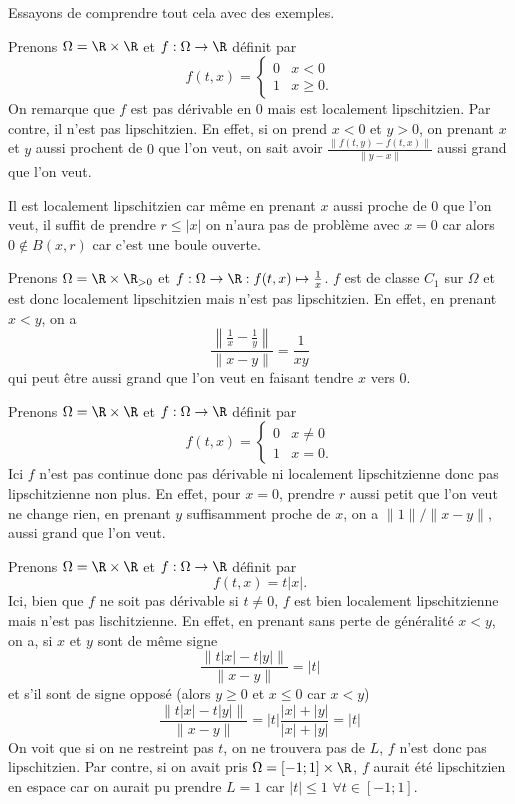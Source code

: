 Essayons de comprendre tout cela avec des exemples.
\begin{myexem}
  \label{ex:ux}
  Prenons $\Omega = \R\times\R$ et $f:\Omega\to\R$ définit par
  \[
    f(t,x) =
    \begin{cases}
      0 & x < 0\\
      1 & x \geq 0.
    \end{cases}
  \]
  On remarque que $f$ est pas dérivable en $0$ mais est localement
  lipschitzien.
  Par contre, il n'est pas lipschitzien.
  En effet, si on prend $x < 0$ et $y > 0$, on prenant $x$ et $y$ aussi
  prochent de $0$ que l'on veut,
  on sait avoir $\frac{\|f(t,y)-f(t,x)\|}{\|y-x\|}$
  aussi grand que l'on veut.

  Il est localement lipschitzien car même en prenant $x$
  aussi proche de $0$ que l'on veut,
  il suffit de prendre $r \leq |x|$ on n'aura pas de problème avec $x = 0$
  car alors $0 \notin B(x,r)$ car c'est une boule ouverte.
\end{myexem}
\begin{myexem}
  Prenons $\Omega = \R\times\R_{>0}$ et
  $f:\Omega\to\R:f(t,x)\mapsto \frac{1}{x}$.
  $f$ est de classe $C_1$ sur $\Omega$ et est donc localement lipschitzien
  mais n'est pas lipschitzien.
  En effet, en prenant $x < y$, on a
  \[ \frac{\left\|\frac{1}{x}-\frac{1}{y}\right\|}{\|x-y\|} = \frac{1}{xy} \]
  qui peut être aussi grand que l'on veut en faisant tendre $x$ vers 0.
\end{myexem}
\begin{myexem}
  Prenons $\Omega = \R\times\R$ et $f:\Omega\to\R$ définit par
  \[
    f(t,x) =
    \begin{cases}
      0 & x \neq 0\\
      1 & x = 0.
    \end{cases}
  \]
  Ici $f$ n'est pas continue donc pas dérivable ni localement lipschitzienne
  donc pas lipschitzienne non plus.
  En effet, pour $x = 0$, prendre $r$ aussi petit que l'on veut ne change rien,
  en prenant $y$ suffisamment proche de $x$, on a $\|1\|/\|x-y\|$,
  aussi grand que l'on veut.
\end{myexem}
\begin{myexem}
  \label{ex:tabsx}
  Prenons $\Omega = \R\times\R$ et $f:\Omega\to\R$ définit par
  \[
    f(t,x) = t|x|.
  \]
  Ici, bien que $f$ ne soit pas dérivable si $t \neq 0$,
  $f$ est bien localement lipschitzienne
  mais n'est pas lischitzienne.
  En effet, en prenant sans perte de généralité $x < y$, on a,
  si $x$ et $y$ sont de même signe
  \[ \frac{\|t|x| - t|y|\|}{\|x-y\|} = |t| \]
  et s'il sont de signe opposé (alors $y \geq 0$ et $x \leq 0$ car $x < y$)
  \[ \frac{\|t|x| - t|y|\|}{\|x-y\|}
  = |t|\frac{|x|+|y|}{|x|+|y|} = |t| \]
  On voit que si on ne restreint pas $t$, on ne trouvera pas
  de $L$, $f$ n'est donc pas lipschitzien.
  Par contre, si on avait pris $\Omega = [-1;1]\times\R$,
  $f$ aurait été lipschitzien en espace car on aurait pu prendre $L = 1$
  car $|t| \leq 1$ $\forall t \in [-1;1]$.
\end{myexem}
